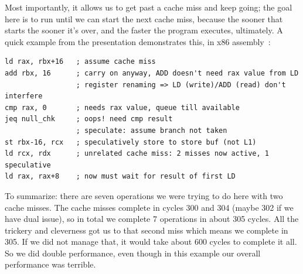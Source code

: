 Most importantly, it allows us to get past a cache miss and keep going; the goal here is to run until we can start the next cache miss, because the sooner that starts the sooner it's over, and the faster the program executes, ultimately. A quick example from the presentation demonstrates this, in x86 assembly~\cite{modern-hardware}:

\begin{verbatim}
ld rax, rbx+16   ; assume cache miss
add rbx, 16      ; carry on anyway, ADD doesn't need rax value from LD
                 ; register renaming => LD (write)/ADD (read) don't interfere
cmp rax, 0       ; needs rax value, queue till available
jeq null_chk     ; oops! need cmp result
                 ; speculate: assume branch not taken
st rbx-16, rcx   ; speculatively store to store buf (not L1)
ld rcx, rdx      ; unrelated cache miss: 2 misses now active, 1 speculative
ld rax, rax+8    ; now must wait for result of first LD
\end{verbatim}


To summarize: there are seven operations we were trying to do here with two cache misses. The cache misses complete in cycles 300 and 304 (maybe 302 if we have dual issue), so in total we complete 7 operations in about 305 cycles. All the trickery and cleverness got us to that second miss which means we complete in 305. If we did not manage that, it would take about 600 cycles to complete it all. So we did double performance, even though in this example our overall performance was terrible.
 

